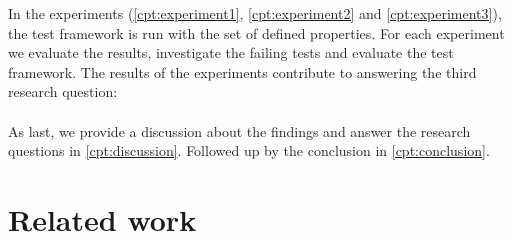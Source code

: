 In the experiments (\autoref{cpt:experiment1}, \autoref{cpt:experiment2} and
\autoref{cpt:experiment3}), the test framework is run with the set of defined
properties. For each experiment we evaluate the results, investigate the failing
tests and evaluate the test framework. The results of the experiments contribute
to answering the third research question:\rqThree\\
\\
As last, we provide a discussion about the findings and answer the research
questions in \autoref{cpt:discussion}. Followed up by the conclusion in
\autoref{cpt:conclusion}.


\section{Related work}

